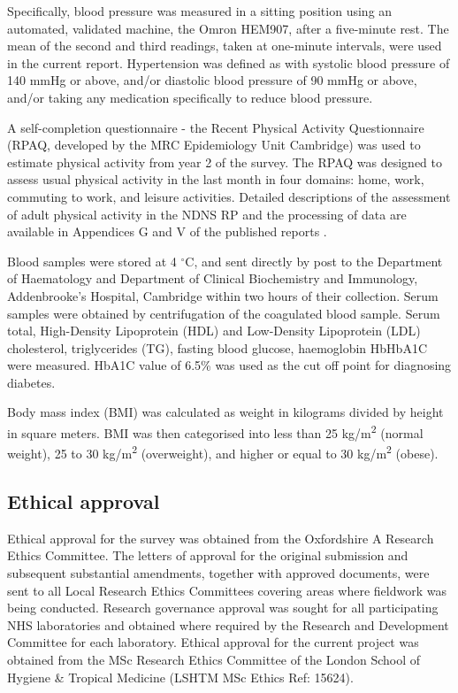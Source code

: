 Specifically, blood pressure was measured in a sitting position using an automated, validated machine, the Omron HEM907, after a five-minute rest. The mean of the second and third readings, taken at one-minute intervals, were used in the current report. Hypertension was defined as with systolic blood pressure of 140 mmHg or above, and/or diastolic blood pressure of 90 mmHg or above, and/or taking any medication specifically to reduce blood pressure. 

A self-completion questionnaire - the Recent Physical Activity Questionnaire  \parencite{besson2009estimating} (RPAQ, developed by the MRC Epidemiology Unit Cambridge) was used to estimate physical activity from year 2 of the survey. The RPAQ was designed to assess usual physical activity in the last month in four domains: home, work, commuting to work, and leisure activities. Detailed descriptions of the assessment of adult physical activity in the NDNS RP and the processing of data are available in Appendices G and V of the published reports \parencite{bates2014national,roberts2018national,NDNSofficial}. 

Blood samples were stored at 4 $^\circ$C, and sent directly by post to the Department of Haematology and Department of Clinical Biochemistry and Immunology, Addenbrooke's Hospital, Cambridge within two hours of their collection. Serum samples were obtained by centrifugation of the coagulated blood sample. Serum total, High-Density Lipoprotein (HDL) and Low-Density Lipoprotein (LDL) cholesterol, triglycerides (TG), fasting blood glucose, haemoglobin HbHbA1C were measured. HbA1C value of 6.5\% was used as the cut off point for diagnosing diabetes.

Body mass index (BMI) was calculated as weight in kilograms divided by height in square meters. BMI was then categorised into less than 25 kg/m\textsuperscript{2} (normal weight), 25 to 30 kg/m\textsuperscript{2} (overweight), and higher or equal to 30 kg/m\textsuperscript{2} (obese). 

\subsection{Ethical approval}\vspace{-0.3cm}

Ethical approval for the survey was obtained from the Oxfordshire A Research Ethics Committee. The letters of approval for the original submission and subsequent substantial amendments, together with approved documents, were sent to all Local Research Ethics Committees covering areas where fieldwork was being conducted. Research governance approval was sought for all participating NHS laboratories and obtained where required by the Research and Development Committee for each laboratory. Ethical approval for the current project was obtained from the MSc Research Ethics Committee of the London School of Hygiene \& Tropical Medicine (LSHTM MSc Ethics Ref: 15624). 


